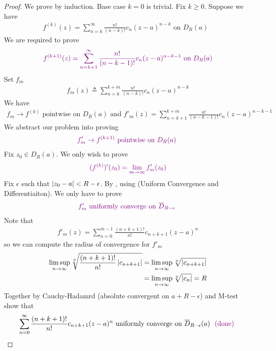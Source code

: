 \documentclass{report}
\begin{document}
\begin{proof}
We prove by induction. Base case $k=0$ is trivial. Fix $k\geq 0$. Suppose we have 
\begin{align*}
f^{(k)}(z)=\sum_{n=k}^{\infty} \frac{n!}{(n-k)!}c_n(z-a)^{n-k}\text{ on $D_R(a)$ }
\end{align*}
We are required to prove 
\begin{align*}
\textcolor{violet}{f^{(k+1)}(z)=\sum_{n=k+1}^\infty \frac{n!}{(n-k-1)!}c_n(z-a)^{n-k-1}\text{ on }D_R(a)}
\end{align*} 
Set $f_m$ 
 \begin{align*}
f_m(z)\triangleq \sum_{n=k}^{k+m} \frac{n!}{(n-k)!}c_n(z-a)^{n-k}
\end{align*}
We have 
\begin{align}
\label{PS1}
f_m \to f^{(k)}\text{ pointwise on $D_R(a)$ and }f'_m (z)= \sum_{n=k+1}^{k+m}\frac{n!}{(n-k-1)!}c_n(z-a)^{n-k-1}
\end{align}
We abstract our problem into proving 
\begin{align*}
  \textcolor{violet}{f'_m \to f^{(k+1)}\text{ pointwise on $D_R(a)$ }}
\end{align*}
Fix $z_0 \in D_R(a)$. We only wish to prove 
\begin{align*}
\textcolor{violet}{(f^{(k)})'(z_0)=\lim_{m\to \infty}f'_m(z_0)}
\end{align*}
Fix $\epsilon $ such that $\left|z_0-a\right|< R-\epsilon $. By , using  (Uniform Convergence and Differentiaiton). We only have to prove 
\begin{align*}
  \textcolor{violet}{f'_m\text{ uniformly converge on $\overline{D}_{R-\epsilon }$ }}
\end{align*}
Note that 
\begin{align*}
f'_m(z)=\sum_{n=0}^{m-1} \frac{(n+k+1)!}{n!}c_{n+k+1}(z-a)^n
\end{align*}
so we can compute the radius of convergence for $f'_m$
\begin{align*}
\limsup_{n\to\infty} \sqrt[n]{\frac{(n+k+1)!}{n!}\left|c_{n+k+1}\right|}&=\limsup_{n\to\infty} \sqrt[n]{\left|c_{n+k+1}\right|} \\
&=\limsup_{n\to\infty} \sqrt[n]{\left|c_n\right|}=R 
\end{align*}
Together by Cauchy-Hadamrd (absolute convergent on $a+R-\epsilon $) and M-test show that 
\begin{align*}
\sum_{n=0}^\infty \frac{(n+k+1)!}{n!}c_{n+k+1}(z-a)^n \text{ uniformly converge on $\overline{D}_{R-\epsilon }(a)$ }\textcolor{violet}{\text{ (done) }}
\end{align*}
\end{proof}
\end{document}
